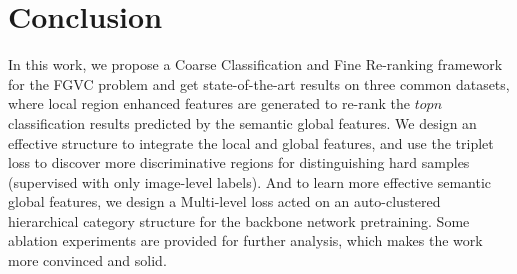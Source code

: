 \documentclass[10pt,twocolumn,letterpaper]{article}
\begin{document}
\section{Conclusion}
In this work, we propose a Coarse Classification and Fine Re-ranking framework for the FGVC problem and get state-of-the-art results on three common datasets, where local region enhanced features are generated to re-rank the $topn$ classification results predicted by the semantic global features. We design an effective structure to integrate the local and global features, and use the triplet loss to discover more discriminative regions for distinguishing hard samples (supervised with only image-level labels). And to learn more effective semantic global features, we design a Multi-level loss acted on an auto-clustered hierarchical category structure for the backbone network pretraining. Some ablation experiments are provided for further analysis, which makes the work more convinced and solid.







{\small


}
\end{document}

